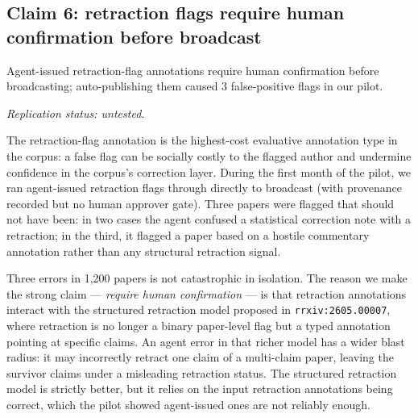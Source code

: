 \documentclass{rrxiv}
\begin{document}

\subsection*{Claim 6: retraction flags require human confirmation before broadcast}

\begin{claim}[type=methodological, evidence=argument, confidence=0.85, rationale={Workflow requirement argued from 3/1200 pilot false positives whose blast radius widens under claim-level retraction; the post-mitigation error rate is untested}, labels={agents, editorial, pilot-study, retraction}, models={claude-opus-4.7}, datasets={rrxiv-corpus-1200-paper-sample}, title={Retraction flags require human confirmation}]
\label{claim:c6}
Agent-issued retraction-flag annotations require human confirmation before broadcasting; auto-publishing them caused 3 false-positive flags in our pilot.

\emph{Replication status: untested.}
\end{claim}

The retraction-flag annotation is the highest-cost evaluative annotation type in the corpus: a false flag can be socially costly to the flagged author and undermine confidence in the corpus's correction layer. During the first month of the pilot, we ran agent-issued retraction flags through directly to broadcast (with provenance recorded but no human approver gate). Three papers were flagged that should not have been: in two cases the agent confused a statistical correction note with a retraction; in the third, it flagged a paper based on a hostile commentary annotation rather than any structural retraction signal.

Three errors in 1{,}200 papers is not catastrophic in isolation. The reason we make the strong claim --- \emph{require human confirmation} --- is that retraction annotations interact with the structured retraction model proposed in \texttt{rrxiv:2605.00007}, where retraction is no longer a binary paper-level flag but a typed annotation pointing at specific claims. An agent error in that richer model has a wider blast radius: it may incorrectly retract one claim of a multi-claim paper, leaving the survivor claims under a misleading retraction status. The structured retraction model is strictly better, but it relies on the input retraction annotations being correct, which the pilot showed agent-issued ones are not reliably enough.
\end{document}
